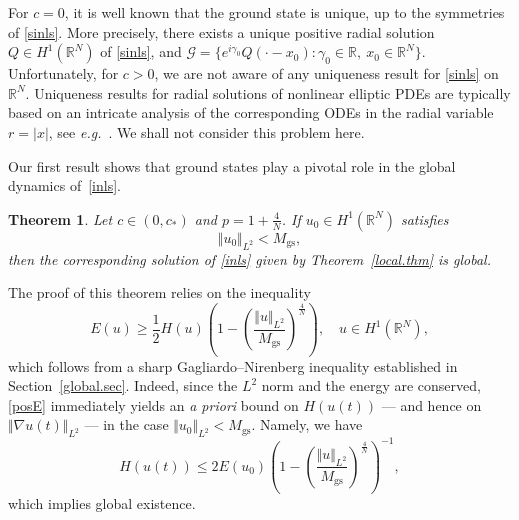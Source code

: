 \documentclass[reqno]{amsart}
\newcommand{\real}{\mathbb{R}}
\newcommand{\rn}{\real^N}
\let\le=\leqslant
\let\ge= \geqslant
\theoremstyle{plain}
\newtheorem{theorem}{Theorem}
\theoremstyle{definition}
\numberwithin{equation}{section}
\begin{document}
For $c=0$, it is well known that the ground state is unique, up to the symmetries of \eqref{sinls}. 
More precisely, there exists a unique positive radial solution $Q\in H^1(\rn)$ of \eqref{sinls}, and
$\mathcal{G}=\{e^{i\gamma_0}Q(\cdot - x_0) : \gamma_0\in\real, \ x_0\in\rn\}$.
Unfortunately, for $c>0$, we are not aware of any uniqueness result for \eqref{sinls} on $\rn$. 
Uniqueness results for radial solutions of nonlinear elliptic PDEs are typically based 
on an intricate analysis of the corresponding ODEs in the radial variable $r=|x|$, 
see {\it e.g.}~\cite{kwong,coffman,peletier,yanagida}. We shall not consider this problem here.

Our first result shows that ground states play a pivotal role in the global dynamics of~\eqref{inls}. 

\begin{theorem}\label{global.thm}
Let $c\in(0,c_*)$ and $p=1+\frac{4}{N}$.
If $u_0\in H^1(\rn)$ satisfies
\begin{equation}\label{sharp}
\Vert u_0\Vert_{L^2}<M_\mathrm{gs},
\end {equation}
then the corresponding solution of \eqref{inls} given by Theorem~\ref{local.thm} is global.
\end{theorem}

The proof of this theorem relies on the inequality
\begin{equation}\label{posE}
E(u)\ge \frac12 H(u)
\left(1-\left(\frac{\Vert u\Vert_{L^2}}{M_\mathrm{gs}}\right)^\frac{4}{N}\right),
\quad u\in H^1(\rn),
\end{equation}
which follows from a sharp Gagliardo--Nirenberg inequality established in Section~\ref{global.sec}.
Indeed, since the $L^2$ norm and the energy are conserved, \eqref{posE} immediately yields
an \emph{a priori} bound on $H(u(t))$ --- and hence on $\Vert\nabla u(t)\Vert_{L^2}$ --- 
in the case $\Vert u_0\Vert_{L^2}<M_\mathrm{gs}$. Namely, we have
\begin{equation} \label{subcritical}
H(u(t)) \le 2E(u_0) \left(1-\left(\frac{\Vert u\Vert_{L^2}}{M_\mathrm{gs}}\right)^\frac{4}{N}\right)^{-1},
\end{equation}
which implies global existence. 
\end{document}
